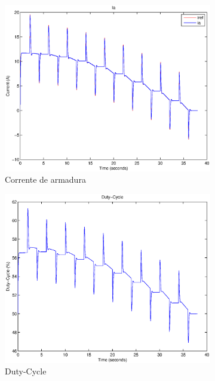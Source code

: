 \documentclass{article}
\begin{document}
\begin{figure}[H]
\begin{subfigure}{0.3\textwidth}
		\includegraphics[width=\linewidth]{matlab/ia6}
		\caption{Corrente de armadura}
	\end{subfigure}
	\begin{subfigure}{0.3\textwidth}
		\includegraphics[width=\linewidth]{matlab/d6}
		\caption{Duty-Cycle}
	\end{subfigure}
	\begin{subfigure}{0.3\textwidth}

\end{subfigure}
\end{figure}
\end{document}
